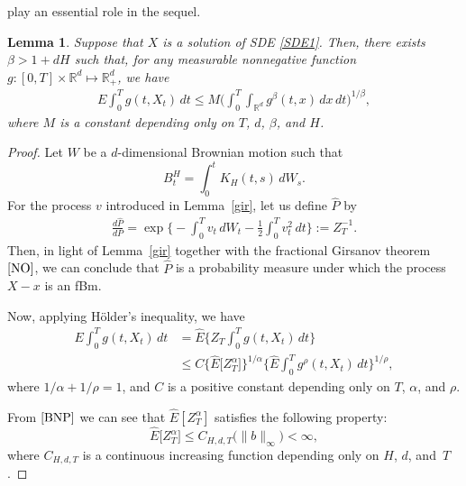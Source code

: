 \documentclass[numbers,compress,v1.0.1]{vmsta}
\def\R{{ \mathbb{R}}}
\newtheorem{lemma}[theorem]{Lemma}
\theoremstyle{definition}
\begin{document}
play an essential role in the sequel.
%
\begin{lemma}
\label{krylov1}
Suppose that $X$ is a solution of SDE \eqref{SDE1}. Then, there exists
$\beta>1+dH$ such that, for
any measurable nonnegative function $g:[0,T]\times\mathbb R^d \mapsto
\mathbb R^d
_+$, we have
%
\begin{eqnarray}
\label{krylovI} E\int_{0}^{T}g(t,X_{t})
\,dt \leq M \Biggl(\int_{0}^{T}\int
_{\R^d} g^{\beta}(t,x)\,dx\,dt \Biggr)^{1/\beta},
\end{eqnarray}
%
where $M$ is a constant depending only on $T$, $d$, $\beta$, and $H$.
\end{lemma}
%
\begin{proof}
Let $W$ be a $d$-dimensional Brownian motion such that
%
\begin{equation*}
B^{H}_t=\int_0^t
K_H(t,s)\,dW_s.
\end{equation*}
%
For the process $v$ introduced in Lemma~\ref{gir}, let us define
$\widehat{P}$ by
%
\begin{eqnarray*}
\label{ZT} \frac{d\widehat{P} }{dP}=\exp \Biggl\{ -\int_{0}^{T}v_{t}
\,dW_{t} - \frac{1}{2}\int_{0}^{T}v_{t}^{2}
\,dt \Biggr\}:=Z_T^{-1}.
\end{eqnarray*}
%
Then, in light of Lemma~\ref{gir} together with the fractional Girsanov
theorem $\mbox{\cite[Thm.~2]{NO}}$, we can conclude that $\widehat{P}$
is a probability measure under which the process $X-x$ is an fBm.

Now, applying H\"{o}lder's inequality, we have
%
\begin{align}
E\int_{0}^{T}g(t,X_{t})\,dt&= \widehat E \Biggl\{Z_T\int_0^Tg(t,X_{t})\,dt\Biggr\}\nonumber\\[-3pt]
&\leq C \bigl\{\widehat{E} \bigl[Z_T^\alpha \bigr] \bigr\}^{1/\alpha} \Biggl\{\widehat{E}\int_{0}^{T}g^{\rho}(t,X_{t})\,dt \Biggr\}^{1/\rho},\label{ineq}
\end{align}
%
where $1/\alpha+1/\rho=1$, and $C$ is a positive constant depending
only on $T$, $\alpha$, and $\rho$.

From $\mbox{\cite[Lemma 4.3]{BNP}}$ we can see that $\widehat
E[Z_T^\alpha]$ satisfies the following property:
%
\begin{equation}
\label{ineq-2} \widehat E\bigl[Z_T^\alpha\bigr] \leq
C_{H,d,T}\bigl(\|b\|_\infty\bigr) < \infty,
\end{equation}
%
where $C_{H,d,T}$ is a continuous increasing function depending only on
$H$, $d$, and~$T$.


\end{proof}
\end{document}
